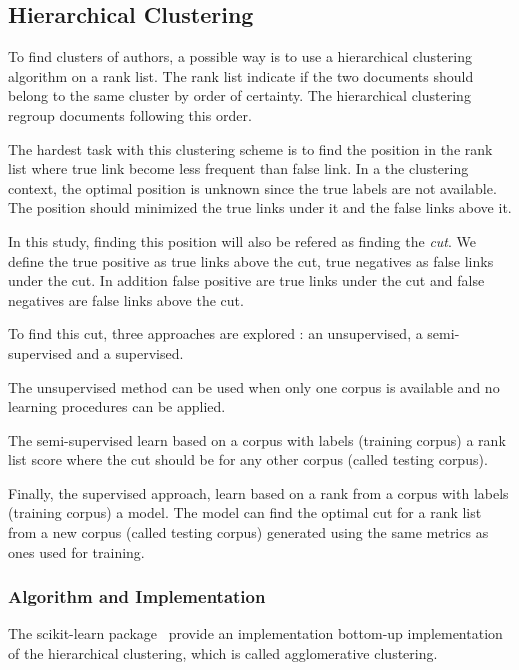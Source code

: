 \subsection{Hierarchical Clustering \label{sec:authorship_clustering_methods}}

To find clusters of authors, a possible way is to use a hierarchical clustering algorithm on a rank list.
The rank list indicate if the two documents should belong to the same cluster by order of certainty.
The hierarchical clustering regroup documents following this order.

The hardest task with this clustering scheme is to find the position in the rank list where true link become less frequent than false link.
In a the clustering context, the optimal position is unknown since the true labels are not available.
The position should minimized the true links under it and the false links above it.

In this study, finding this position will also be refered as finding the \textit{cut}.
We define the true positive as true links above the cut, true negatives as false links under the cut.
In addition false positive are true links under the cut and false negatives are false links above the cut.

To find this cut, three approaches are explored : an unsupervised, a semi-supervised and a supervised.

The unsupervised method can be used when only one corpus is available and no learning procedures can be applied.

The semi-supervised learn based on a corpus with labels (training corpus) a rank list score where the cut should be for any other corpus (called testing corpus).

Finally, the supervised approach, learn based on a rank from a corpus with labels (training corpus) a model.
The model can find the optimal cut for a rank list from a new corpus (called testing corpus) generated using the same metrics as ones used for training.

\subsubsection{Algorithm and Implementation \label{sec:algorithm_and_implementation}}

The scikit-learn package~\cite{sklearn} provide an implementation bottom-up implementation of the hierarchical clustering, which is called agglomerative clustering.


